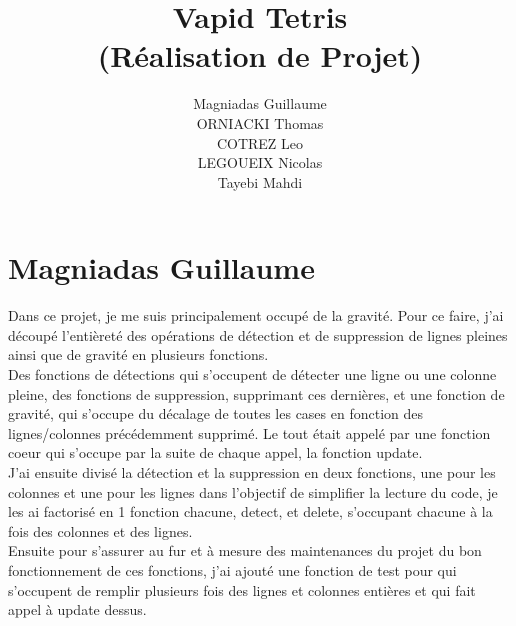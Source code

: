 \documentclass[11pt]{article}
\title{\textbf{Vapid Tetris}\\ {\normalsize (Réalisation de Projet)}}
\author{Magniadas Guillaume\\
		ORNIACKI Thomas\\
		COTREZ Leo\\
		LEGOUEIX Nicolas\\
		Tayebi Mahdi\\
		}
\date{}
\begin{document}
\maketitle

\section{Magniadas Guillaume}

Dans ce projet, je me suis principalement occupé de la gravité. Pour ce faire, j'ai découpé l'entièreté des opérations de détection et de suppression de lignes pleines ainsi que de gravité en plusieurs fonctions.\\
Des fonctions de détections qui s'occupent de détecter une ligne ou une colonne pleine, des fonctions de suppression, supprimant ces dernières, et une fonction de gravité, qui s'occupe du décalage de toutes les cases en fonction des lignes/colonnes précédemment supprimé.
Le tout était appelé par une fonction coeur qui s'occupe par la suite de chaque appel, la fonction update.\\
J'ai ensuite divisé la détection et la suppression en deux fonctions, une pour les colonnes et une pour les lignes dans l'objectif de simplifier la lecture du code, je les ai factorisé en 1 fonction chacune, detect, et delete, s'occupant chacune à la fois des colonnes et des lignes.\\
Ensuite pour s'assurer au fur et à mesure des maintenances du projet du bon fonctionnement de ces fonctions, j'ai ajouté une fonction de test pour qui s'occupent de remplir plusieurs fois des lignes et colonnes entières et qui fait appel à update dessus.
\end{document}
